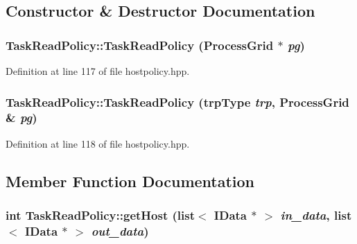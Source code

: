 \subsection{Constructor \& Destructor Documentation}
\hypertarget{class_task_read_policy_a7256d073f6b90f4634309d01b51d4270}{
\subsubsection[{TaskReadPolicy}]{\setlength{\rightskip}{0pt plus 5cm}TaskReadPolicy::TaskReadPolicy ({\bf ProcessGrid} $\ast$ {\em pg})}}
\label{class_task_read_policy_a7256d073f6b90f4634309d01b51d4270}


Definition at line 117 of file hostpolicy.hpp.\hypertarget{class_task_read_policy_a5f0b8a0896b5ef07ef8e5e210fe7dc5b}{
\subsubsection[{TaskReadPolicy}]{\setlength{\rightskip}{0pt plus 5cm}TaskReadPolicy::TaskReadPolicy ({\bf trpType} {\em trp}, \/  {\bf ProcessGrid} \& {\em pg})}}
\label{class_task_read_policy_a5f0b8a0896b5ef07ef8e5e210fe7dc5b}


Definition at line 118 of file hostpolicy.hpp.

\subsection{Member Function Documentation}
\hypertarget{class_task_read_policy_abdf52c85a0ad32a1ad8f63571c0867cf}{
\subsubsection[{getHost}]{\setlength{\rightskip}{0pt plus 5cm}int TaskReadPolicy::getHost (list$<$ {\bf IData} $\ast$ $>$ {\em in\_\-data}, \/  list$<$ {\bf IData} $\ast$ $>$ {\em out\_\-data})}}
\label{class_task_read_policy_abdf52c85a0ad32a1ad8f63571c0867cf}


